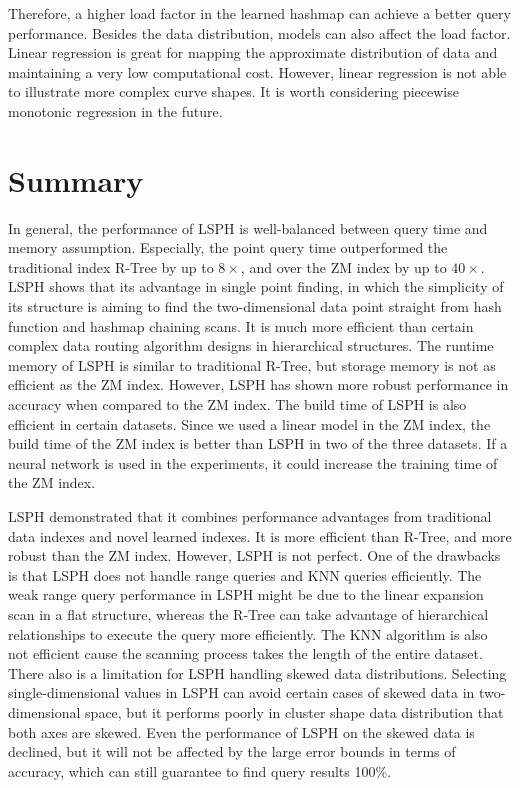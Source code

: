 Therefore, a higher load factor in the learned hashmap can achieve a better query performance. Besides the data distribution, models can also affect the load factor. Linear regression is great for mapping the approximate distribution of data and maintaining a very low computational cost. However, linear regression is not able to illustrate more complex curve shapes. It is worth considering piecewise monotonic regression in the future. 


\section{Summary}
In general, the performance of LSPH is well-balanced between query time and memory assumption. Especially, the point query time outperformed the traditional index R-Tree by up to $8\times$, and over the ZM index by up to $40\times$. LSPH shows that its advantage in single point finding, in which the simplicity of its structure is aiming to find the two-dimensional data point straight from hash function and hashmap chaining scans. It is much more efficient than certain complex data routing algorithm designs in hierarchical structures. The runtime memory of LSPH is similar to traditional R-Tree, but storage memory is not as efficient as the ZM index. However, LSPH has shown more robust performance in accuracy when compared to the ZM index. The build time of LSPH is also efficient in certain datasets. Since we used a linear model in the ZM index, the build time of the ZM index is better than LSPH in two of the three datasets. If a neural network is used in the experiments, it could increase the training time of the ZM index.


LSPH demonstrated that it combines performance advantages from traditional data indexes and novel learned indexes. It is more efficient than R-Tree, and more robust than the ZM index. However, LSPH is not perfect. One of the drawbacks is that LSPH does not handle range queries and KNN queries efficiently. The weak range query performance in LSPH might be due to the linear expansion scan in a flat structure, whereas the R-Tree can take advantage of hierarchical relationships to execute the query more efficiently. The KNN algorithm is also not efficient cause the scanning process takes the length of the entire dataset. There also is a limitation for LSPH handling skewed data distributions. Selecting single-dimensional values in LSPH can avoid certain cases of skewed data in two-dimensional space, but it performs poorly in cluster shape data distribution that both axes are skewed. Even the performance of LSPH on the skewed data is declined, but it will not be affected by the large error bounds in terms of accuracy, which can still guarantee to find query results 100\%.


